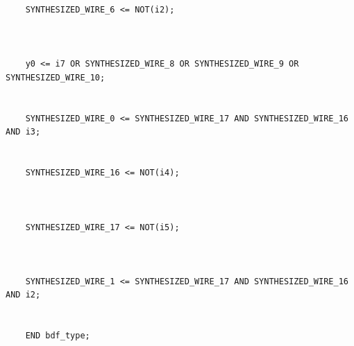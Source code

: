 \documentclass[12pt]{article}
\begin{document}
\begin{verbatim}
    SYNTHESIZED_WIRE_6 <= NOT(i2);



    y0 <= i7 OR SYNTHESIZED_WIRE_8 OR SYNTHESIZED_WIRE_9 OR SYNTHESIZED_WIRE_10;


    SYNTHESIZED_WIRE_0 <= SYNTHESIZED_WIRE_17 AND SYNTHESIZED_WIRE_16 AND i3;


    SYNTHESIZED_WIRE_16 <= NOT(i4);



    SYNTHESIZED_WIRE_17 <= NOT(i5);



    SYNTHESIZED_WIRE_1 <= SYNTHESIZED_WIRE_17 AND SYNTHESIZED_WIRE_16 AND i2;


    END bdf_type;

\end{verbatim}
\end{document}
